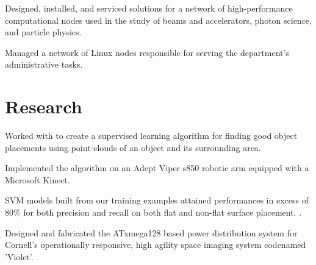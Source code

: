 \documentclass[]{deedy-resume-openfont}
\begin{document}
    \begin{tightemize}
        \item
            Designed, installed, and serviced solutions for a network of
            high-performance computational nodes used in the study of beams
            and accelerators, photon science, and particle physics.
        \item
            Managed a network of Linux nodes responsible for serving the
            department’s administrative tasks.
    \end{tightemize}
\sectionsep

\section{Research}
            \begin{tightemize}
                \item
                    Worked with  to create a supervised learning algorithm
                    for finding good object placements using point-clouds of an object
                    and its surrounding area.
                \item
                    Implemented the algorithm on an Adept
                    Viper s850 robotic arm equipped with a Microsoft Kinect.
                \item
                    SVM models
                    built from our training examples attained performances in excess of
                    80\% for both precision and recall on both flat and non-flat
                    surface placement.
                    .
            \end{tightemize}
    \sectionsep

            \begin{tightemize}
                \item
                    Designed and fabricated the ATxmega128 based power distribution
                    system for Cornell’s operationally responsive, high agility
                    space imaging system codenamed 'Violet'.
            \end{tightemize}
    \sectionsep
\end{document}
